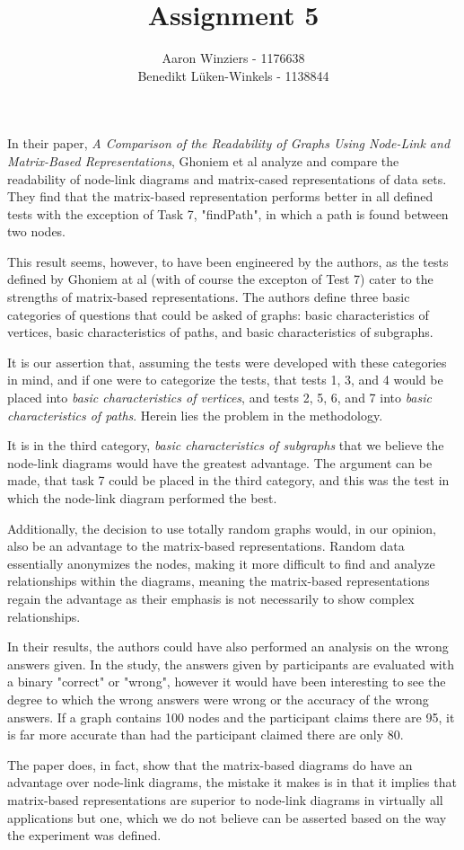 \documentclass[10pt,a4paper]{article}
\author{Aaron Winziers - 1176638	\\
		Benedikt Lüken-Winkels - 1138844}
\title{Assignment 5}
\begin{document}
	\maketitle
	In their paper, \textit{A Comparison of the Readability of Graphs Using Node-Link and Matrix-Based Representations}, Ghoniem et al analyze and compare the readability of node-link diagrams and matrix-cased representations of data sets. They find that the matrix-based representation performs better in all defined tests with the exception of Task 7, "findPath", in which a path is found between two nodes.
	
	This result seems, however, to have been engineered by the authors, as the tests defined by Ghoniem at al (with of course the excepton of Test 7) cater to the strengths of matrix-based representations. The authors define three basic categories of questions that could be asked of graphs: basic characteristics of vertices, basic characteristics of paths, and basic characteristics of subgraphs. 
	
	It is our assertion that, assuming the tests were developed with these categories in mind, and if one were to categorize the tests, that tests 1, 3, and 4 would be placed into \textit{basic characteristics of vertices}, and tests 2, 5, 6, and 7 into \textit{basic characteristics of paths}. Herein lies the problem in the methodology.
	
	It is in the third category, \textit{basic characteristics of subgraphs} that we believe the node-link diagrams would have the greatest advantage. The argument can be made, that task 7 could be placed in the third category, and this was the test in which the node-link diagram performed the best.
	
	Additionally, the decision to use totally random graphs would, in our opinion, also be an advantage to the matrix-based representations. Random data essentially anonymizes the nodes, making it more difficult to find and analyze relationships within the diagrams, meaning the matrix-based representations regain the advantage as their emphasis is not necessarily to show complex relationships.
	
	In their results, the authors could have also performed an analysis on the wrong answers given. In the study, the answers given by participants are evaluated with a binary "correct" or "wrong", however it would have been interesting to see the degree to which the wrong answers were wrong or the accuracy of the wrong answers. If a graph contains 100 nodes and the participant claims there are 95, it is far more accurate than had the participant claimed there are only 80.
	
	The paper does, in fact, show that the matrix-based diagrams do have an advantage over node-link diagrams, the mistake it makes is in that it implies that matrix-based representations are superior to node-link diagrams in virtually all applications but one, which we do not believe can be asserted based on the way the experiment was defined.
\end{document}
